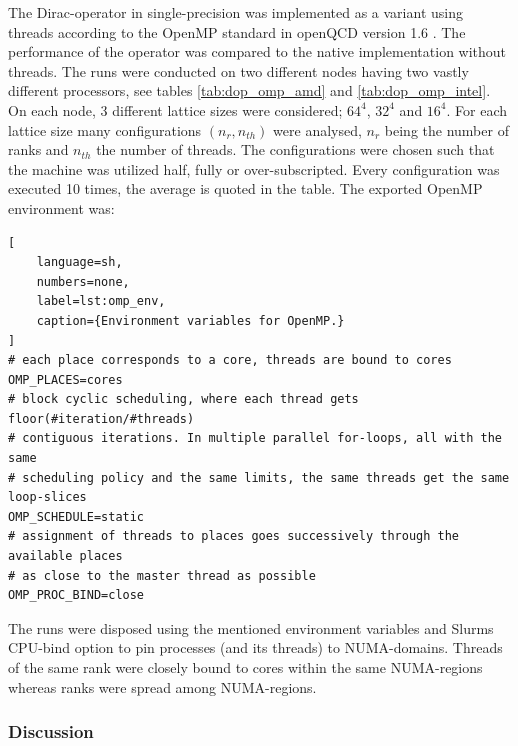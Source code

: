\documentclass{article}
\theoremstyle{plain} %
\theoremstyle{convention} %
\theoremstyle{remark} %
\numberwithin{equation}{section}
\begin{document}
The Dirac-operator in single-precision was implemented as a variant using threads according to the OpenMP standard in openQCD version 1.6 \cite{openqcd}. The performance of the operator was compared to the native implementation without threads. The runs were conducted on two different nodes having two vastly different processors, see tables \ref{tab:dop_omp_amd} and \ref{tab:dop_omp_intel}. On each node, \num{3} different lattice sizes were considered; $64^4$, $32^4$ and $16^4$. For each lattice size many configurations $(n_r,n_{th})$ were analysed, $n_r$ being the number of ranks and $n_{th}$ the number of threads. The configurations were chosen such that the machine was utilized half, fully or over-subscripted. Every configuration was executed \num{10} times, the average is quoted in the table. The exported OpenMP environment was:

\begin{lstlisting}[
    language=sh,
    numbers=none,
    label=lst:omp_env,
    caption={Environment variables for OpenMP.}
]
# each place corresponds to a core, threads are bound to cores
OMP_PLACES=cores
# block cyclic scheduling, where each thread gets floor(#iteration/#threads)
# contiguous iterations. In multiple parallel for-loops, all with the same
# scheduling policy and the same limits, the same threads get the same loop-slices
OMP_SCHEDULE=static
# assignment of threads to places goes successively through the available places
# as close to the master thread as possible
OMP_PROC_BIND=close
\end{lstlisting}

The runs were disposed using the mentioned environment variables and Slurms CPU-bind option to pin processes (and its threads) to NUMA-domains. Threads of the same rank were closely bound to cores within the same NUMA-regions whereas ranks were spread among NUMA-regions.

\subsubsection{Discussion}
\end{document}

